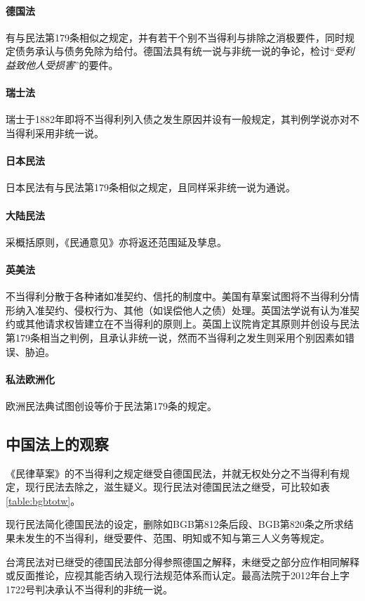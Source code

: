 \documentclass[UTF-8]{ctexrep}
\newcommand{\article}[1]{民法第#1条}
\newcommand{\bgb}[1]{BGB第#1条}
\newcommand{\quot}[1]{“\emph{#1}”}
\newcommand{\cas}[2]{#1年台上字#2号}
\begin{document}
  \paragraph{德国法}有与\article{179}相似之规定，并有若干个别不当得利与排除之消极要件，同时规定债务承认与债务免除为给付。德国法具有统一说与非统一说的争论，检讨\quot{受利益致他人受损害}的要件。
  \paragraph{瑞士法}瑞士于1882年即将不当得利列入债之发生原因并设有一般规定，其判例学说亦对不当得利采用非统一说。
  \paragraph{日本民法}日本民法有与\article{179}相似之规定，且同样采非统一说为通说。
  \paragraph{大陆民法}采概括原则，《民通意见》亦将返还范围延及孳息。
  \paragraph{英美法}不当得利分散于各种诸如准契约、信托的制度中。美国有草案试图将不当得利分情形纳入准契约、侵权行为、其他（如误偿他人之债）处理。英国法学说有认为准契约或其他请求权皆建立在不当得利的原则上。英国上议院肯定其原则并创设与\article{179}相当之判例，且承认非统一说，然而不当得利之发生则采用个别因素如错误、胁迫。
  \paragraph{私法欧洲化}欧洲民法典试图创设等价于\article{179}的规定。
  \subsection{中国法上的观察}
  《民律草案》的不当得利之规定继受自德国民法，并就无权处分之不当得利有规定，现行民法去除之，滋生疑义。现行民法对德国民法之继受，可比较如表\ref{table:bgbtotw}。

    \par
  现行民法简化德国民法的设定，删除如\bgb{812}后段、\bgb{820}之所求结果未发生的不当得利，继受要件、范围、明知或不知与第三人义务等规定。
  \par
  台湾民法对已继受的德国民法部分得参照德国之解释，未继受之部分应作相同解释或反面推论，应视其能否纳入现行法规范体系而认定。最高法院于\cas{2012}{1722}判决承认不当得利的非统一说。
\end{document}
